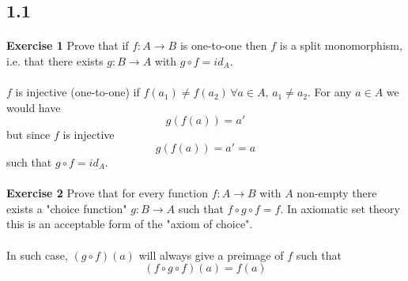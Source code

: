 \documentclass[a4paper,12pt,twoside,leqno]{article}
\title{}
\author{}
\date{}
\begin{document}
\maketitle
{}
\paragraph*{}

\subsection*{1.1}
\paragraph*{}
\textbf{Exercise 1} Prove that if $f: A \rightarrow B$ is one-to-one then $f$ is a split monomorphism, i.e. that there exists $g: B \rightarrow A$ with $g \circ f = id_{A}$.\paragraph*{}
$f$ is injective (one-to-one) if $f(a_{1}) \neq f(a_{2})\, \forall a \in A, \, a_1 \neq a_2$. For any $a \in A$ we would have
$$
g(f(a)) = a'
$$
but since $f$ is injective
$$
g(f(a)) = a' = a
$$ 
such that $g \circ f = id_{A}$.
\paragraph*{}
\textbf{Exercise 2} Prove that for every function $f: A \rightarrow B$ with $A$ non-empty there exists a "choice function" $g: B \rightarrow A$ such that $f \circ g \circ f = f$. In axiomatic set theory this is an acceptable form of the "axiom of choice".\paragraph*{}
In such case, $(g \circ f)(a)$ will always give a preimage of $f$ such that
$$
(f \circ g \circ f)(a) = f(a)
$$
\end{document}
